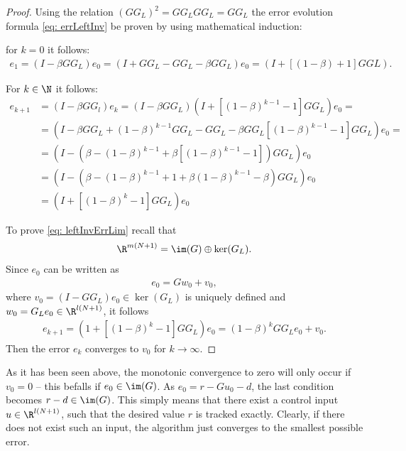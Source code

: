 \begin{proof}
	Using the relation $(GG_L)^2 = GG_LGG_L = GG_L$ the error evolution formula \eqref{eq: errLeftInv} be proven by using mathematical induction: 
        
        for $k = 0$ it follows: 
        \begin{align*}
        e_1 = (I - \beta G G_L)e_0 = (I + GG_L - GG_L - \beta G G_L)e_0 = (I + \left[(1 - \beta) + 1\right]GGL).
        \end{align*}
        
        For $k \in \N$ it follows: 
        \begin{align*}
        e_{k+1} &= ( I - \beta G G_l)e_k = ( I - \beta G G_L) (I+  \left[(1-\beta)^{k-1} - 1\right] G G_L) e_0 = \\
        & = \left(I - \beta G G_L + (1-\beta)^{k-1}GG_L - GG_L - \beta GG_L\left[(1 - \beta)^{k-1} - 1\right]GG_L\right)e_0=\\
        & = \left(I - (\beta - (1-\beta)^{k-1} + \beta\left[(1 - \beta)^{k-1} - 1\right])G G_L\right)e_0\\
        & = \left(I - \left(\beta - (1-\beta)^{k-1} + 1 + \beta(1-\beta)^{k-1} - \beta\right)GG_L\right)e_0\\
        & = (I+  \left[(1-\beta)^k - 1\right] G G_L) e_0
        \end{align*}
        
        To prove \eqref{eq: leftInvErrLim} recall that 
        \begin{align*}
        \R^{m(N+1)} = \im(G)\oplus \ker (G_L). 
        \end{align*}
        Since $e_0$ can be written as 
        \begin{align*}
        e_0 = G w_0 + v_0,
        \end{align*}
        where $v_0 = (I - G G_L)e_0 \in \ker (G_L)$  is uniquely defined and $w_0 = G_L e_0 \in \R^{l(N+1)}$, it follows 
        \begin{align*}
        e_{k+1} = (1+ \left[(1 - \beta)^k - 1\right]GG_L)e_0 = (1-\beta)^{k} GG_Le_0 + v_0.
        \end{align*}
        Then the error $e_k$ converges to $v_0$ for $k \to \infty$. 
\end{proof}

As it has been seen above, the monotonic convergence to zero will only occur if $v_0 = 0$ -- this befalls if $e_0 \in \im(G)$. As $e_0 = r - Gu_0 - d$, the last condition becomes $r - d \in \im(G)$. This simply means that there exist a control input $u \in \R^{l(N+1)}$, such that the desired value $r$ is tracked exactly. 
Clearly, if there does not exist such an input, the algorithm just converges to the smallest possible error. 

